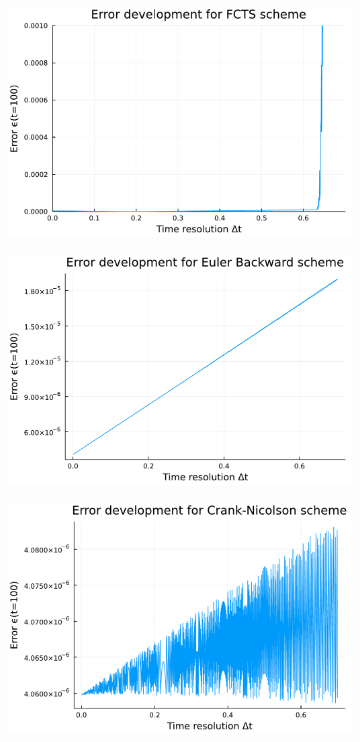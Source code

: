 \documentclass[
	a4paper, %
	10pt, %
]{CSUniSchoolLabReport}
\begin{document}
\begin{figure}[H]
	\centering
	\begin{subfigure}[b]{0.49\textwidth}
		\includegraphics[width=\textwidth]{../saves_t2/error_development_fcts.pdf}
	\end{subfigure}
	\hfill
	\begin{subfigure}[b]{0.49\textwidth}
		\includegraphics[width=\textwidth]{../saves_t2/error_development_eb.pdf}
	\end{subfigure}
	\hfill
	\begin{subfigure}[b]{0.49\textwidth}
		\includegraphics[width=\textwidth]{../saves_t2/error_development_cn.pdf}

\end{subfigure}
\end{figure}
\end{document}

